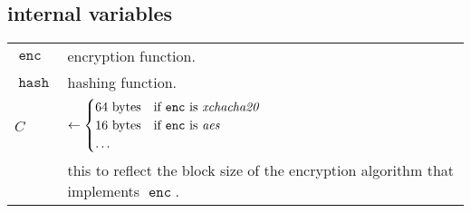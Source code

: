 \documentclass[twocolumn]{article}
\DeclareMathOperator{\enc}{\mathtt{enc}}
\DeclareMathOperator{\hash}{\mathtt{hash}}
\begin{document}
\subsection{internal variables}
\begin{tabularx}{\columnwidth}{lX}
    $\enc$ & encryption function.\\
    $\hash$ & hashing function.\\
    $C$         & $\gets \begin{cases}
                        64 \text{ bytes} & \text{if $\enc$ is
                                            \emph{xchacha20}}\\
                        16 \text{ bytes} & \text{if $\enc$ is \emph{aes}}\\
                        \ldots & \\
                     \end{cases}$\\
                & this to reflect the block size of the encryption
                    algorithm that implements $\enc$.\\
\end{tabularx}
\end{document}
